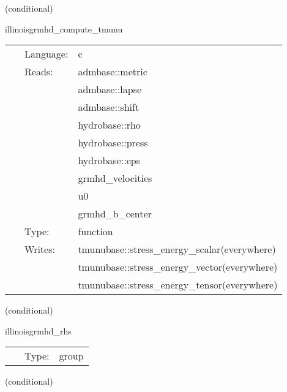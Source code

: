 \vspace{5mm}

   (conditional) 

\hspace{5mm} illinoisgrmhd\_compute\_tmunu 

\hspace{5mm}{\it compute stress-energy tensor } 


\hspace{5mm}

 \begin{tabular*}{160mm}{cll} 
~ & Language:  & c \\ 
~ & Reads:  & admbase::metric \\ 
~& ~ &admbase::lapse\\ 
~& ~ &admbase::shift\\ 
~& ~ &hydrobase::rho\\ 
~& ~ &hydrobase::press\\ 
~& ~ &hydrobase::eps\\ 
~& ~ &grmhd\_velocities\\ 
~& ~ &u0\\ 
~& ~ &grmhd\_b\_center\\ 
~ & Type:  & function \\ 
~ & Writes:  & tmunubase::stress\_energy\_scalar(everywhere) \\ 
~& ~ &tmunubase::stress\_energy\_vector(everywhere)\\ 
~& ~ &tmunubase::stress\_energy\_tensor(everywhere)\\ 
\end{tabular*} 


\vspace{5mm}

   (conditional) 

\hspace{5mm} illinoisgrmhd\_rhs 

\hspace{5mm}{\it evaluate rhss grhd equations } 


\hspace{5mm}

 \begin{tabular*}{160mm}{cll} 
~ & Type:  & group \\ 
\end{tabular*} 


\vspace{5mm}

   (conditional) 

